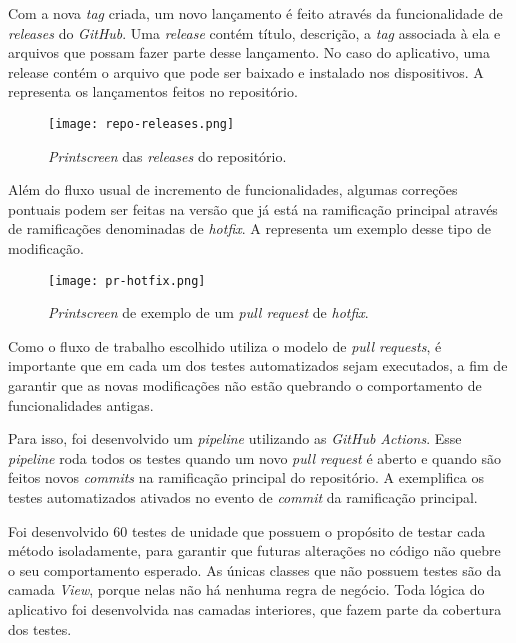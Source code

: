 Com a nova \textit{tag} criada, um novo lançamento é feito através da funcionalidade de \textit{releases} do \textit{GitHub}. Uma \textit{release} contém título, descrição, a \textit{tag} associada à ela e arquivos que possam fazer parte desse lançamento. No caso do aplicativo, uma release contém o arquivo  que pode ser baixado e instalado nos dispositivos. A  representa os lançamentos feitos no repositório.

\begin{figure}[!htb]
  \centering
  \texttt{[image: repo-releases.png]}
  \caption{\textit{Printscreen} das \textit{releases} do repositório.}
  \label{fig:currentreleases}
\end{figure}

Além do fluxo usual de incremento de funcionalidades, algumas correções pontuais podem ser feitas na versão que já está na ramificação principal através de ramificações denominadas de \textit{hotfix}. A  representa um exemplo desse tipo de modificação.

\begin{figure}[!htb]
  \centering
  \texttt{[image: pr-hotfix.png]}
  \caption{\textit{Printscreen} de exemplo de um \textit{pull request} de \textit{hotfix}.}
  \label{fig:hotfixpr}
\end{figure}

Como o fluxo de trabalho escolhido utiliza o modelo de \textit{pull requests}, é importante que em cada um dos testes automatizados sejam executados, a fim de garantir que as novas modificações não estão quebrando o comportamento de funcionalidades antigas.

Para isso, foi desenvolvido um \textit{pipeline} utilizando as \textit{GitHub Actions}. Esse \textit{pipeline} roda todos os testes quando um novo \textit{pull request} é aberto e quando são feitos novos \textit{commits} na ramificação principal do repositório. A  exemplifica os testes automatizados ativados no evento de \textit{commit} da ramificação principal.

Foi desenvolvido 60 testes de unidade que possuem o propósito de testar cada método isoladamente, para garantir que futuras alterações no código não quebre o seu comportamento esperado. As únicas classes que não possuem testes são da camada \textit{View}, porque nelas não há nenhuma regra de negócio. Toda lógica do aplicativo foi desenvolvida nas camadas interiores, que fazem parte da cobertura dos testes.

